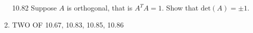 \documentclass[12pt]{article}
\theoremstyle{definition}
\theoremstyle{plain}
\begin{document}
\begin{enumerate}
\item[10.82]Suppose $A$ is orthogonal, that is $A^TA=1$. Show that $\mathrm{det}(A)=\pm 1$.

\item TWO OF 10.67, 10.83, 10.85, 10.86	
\end{enumerate}
\end{document}
